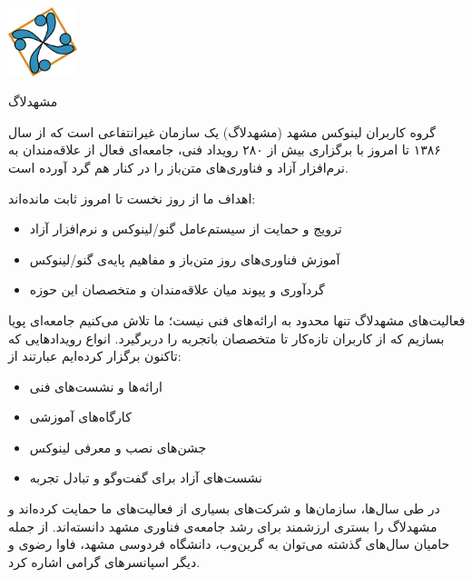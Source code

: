 \documentclass[a4paper]{article}
\begin{document}
\begin{minipage}{0.2\textwidth}
  \includegraphics[width=2cm]{assets/logo.png}
\end{minipage}
\hfill
\begin{minipage}{0.7\textwidth}
  \raggedleft
  {\Huge مشهدلاگ}\\\vspace{0.2cm}
  {\Large {}}
\end{minipage}

\vspace{1cm}

گروه کاربران لینوکس مشهد (مشهدلاگ) یک سازمان غیرانتفاعی است که از سال ۱۳۸۶ تا امروز با برگزاری بیش از ۲۸۰ رویداد فنی، جامعه‌ای فعال از علاقه‌مندان به نرم‌افزار آزاد و فناوری‌های متن‌باز را در کنار هم گرد آورده است.

اهداف ما از روز نخست تا امروز ثابت مانده‌اند:

\begin{itemize}
\item ترویج و حمایت از سیستم‌عامل گنو/لینوکس و نرم‌افزار آزاد
\item آموزش فناوری‌های روز متن‌باز و مفاهیم پایه‌ی گنو/لینوکس
\item گردآوری و پیوند میان علاقه‌مندان و متخصصان این حوزه
\end{itemize}

فعالیت‌های مشهدلاگ تنها محدود به ارائه‌های فنی نیست؛ ما تلاش می‌کنیم جامعه‌ای پویا بسازیم که از کاربران تازه‌کار تا متخصصان باتجربه را دربرگیرد.
انواع رویدادهایی که تاکنون برگزار کرده‌ایم عبارتند از:

\begin{itemize}
\item ارائه‌ها و نشست‌های فنی
\item کارگاه‌های آموزشی
\item جشن‌های نصب و معرفی لینوکس
\item نشست‌های آزاد برای گفت‌وگو و تبادل تجربه
\end{itemize}

در طی سال‌ها، سازمان‌ها و شرکت‌های بسیاری از فعالیت‌های ما حمایت کرده‌اند و مشهدلاگ را بستری ارزشمند برای رشد جامعه‌ی فناوری مشهد دانسته‌اند.
از جمله حامیان سال‌های گذشته می‌توان به گرین‌وب، دانشگاه فردوسی مشهد، فاوا رضوی و دیگر اسپانسرهای گرامی اشاره کرد.
\end{document}
